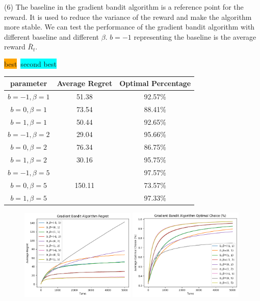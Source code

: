 (6) The baseline in the gradient bandit algorithm is a reference point for the reward. It is used to reduce the variance of the reward and make the algorithm more stable. We can test the performance of the gradient bandit algorithm with different baseline and different $\beta$. $b=-1$ representing the baseline is the average reward $\bar{R}_t$.

\begin{table}[h]
    \centering
    \colorbox{orange}{best}\ \colorbox{cyan}{second best} \\
    \begin{tabular}{c c c}
    \toprule
    parameter & Average Regret & Optimal Percentage \\
    \midrule
    $b=-1, \beta=1$ & 51.38 & 92.57\% \\
    $b=0,  \beta=1$ & 73.54 & 88.41\% \\
    $b=1,  \beta=1$ & 50.44 & 92.65\% \\
    \midrule
    $b=-1, \beta=2$ & 29.04 & 95.66\% \\
    $b=0,  \beta=2$ & 76.34 & 86.75\% \\
    $b=1,  \beta=2$ & 30.16 & 95.75\% \\
    \midrule
    $b=-1, \beta=5$ & \cellcolor{orange}{16.07}  & 97.57\% \\
    $b=0,  \beta=5$ & 150.11 & 73.57\% \\
    $b=1,  \beta=5$ & \cellcolor{cyan}{16.59}  & 97.33\% \\
    \bottomrule
\end{tabular}
\vspace{-0.5cm}
\end{table}

\begin{figure}[!htbp]
    \centering
    \includegraphics[width=0.49\textwidth]{./figure/gradient_bandit_baseline_regret.png}
    \includegraphics[width=0.49\textwidth]{./figure/gradient_bandit_baseline_optimal.png}
    \vspace{-0.5cm}
\end{figure}

